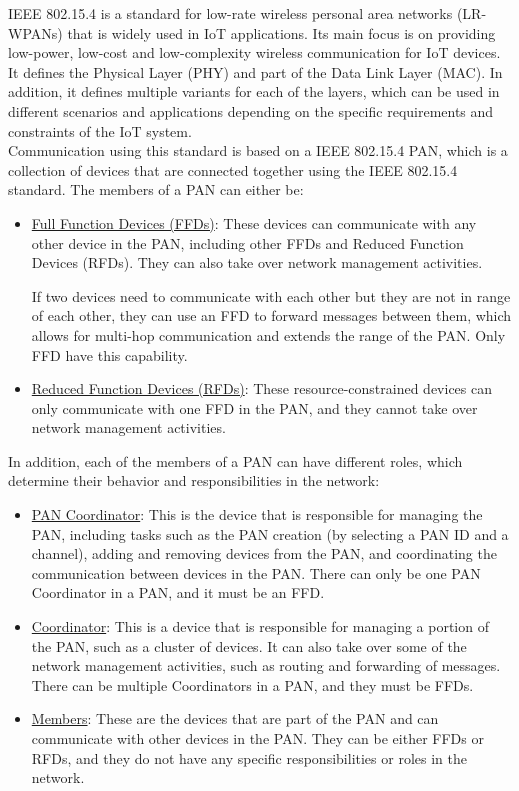IEEE 802.15.4 is a standard for low-rate wireless personal area networks (LR-WPANs) that is widely used in IoT applications. Its main focus is on providing low-power, low-cost and low-complexity wireless communication for IoT devices. It defines the Physical Layer (PHY) and part of the Data Link Layer (MAC). In addition, it defines multiple variants for each of the layers, which can be used in different scenarios and applications depending on the specific requirements and constraints of the IoT system.\\

Communication using this standard is based on a IEEE 802.15.4 PAN, which is a collection of devices that are connected together using the IEEE 802.15.4 standard. The members of a PAN can either be:
\begin{itemize}
    \item \ul{Full Function Devices (FFDs)}: These devices can communicate with any other device in the PAN, including other FFDs and Reduced Function Devices (RFDs). They can also take over network management activities.
    
    If two devices need to communicate with each other but they are not in range of each other, they can use an FFD to forward messages between them, which allows for multi-hop communication and extends the range of the PAN. Only FFD have this capability.
    \item \ul{Reduced Function Devices (RFDs)}: These resource-constrained devices can only communicate with one FFD in the PAN, and they cannot take over network management activities.
\end{itemize}

In addition, each of the members of a PAN can have different roles, which determine their behavior and responsibilities in the network:
\begin{itemize}
    \item \ul{PAN Coordinator}: This is the device that is responsible for managing the PAN, including tasks such as the PAN creation (by selecting a PAN ID and a channel), adding and removing devices from the PAN, and coordinating the communication between devices in the PAN. There can only be one PAN Coordinator in a PAN, and it must be an FFD.
    \item \ul{Coordinator}: This is a device that is responsible for managing a portion of the PAN, such as a cluster of devices. It can also take over some of the network management activities, such as routing and forwarding of messages. There can be multiple Coordinators in a PAN, and they must be FFDs.
    \item \ul{Members}: These are the devices that are part of the PAN and can communicate with other devices in the PAN. They can be either FFDs or RFDs, and they do not have any specific responsibilities or roles in the network.
\end{itemize}

